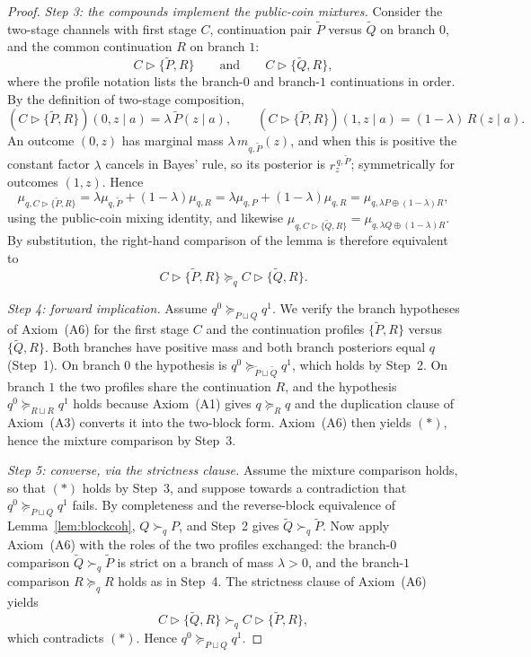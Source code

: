 \documentclass[11pt,a4paper]{article}
\theoremstyle{definition}
\newcommand{\1}{\mathbf 1}
\begin{document}
\begin{proof}
\emph{Step 3: the compounds implement the public-coin mixtures.}
Consider the two-stage channels with first stage $C$, continuation pair $\widetilde P$ versus $\widetilde Q$ on branch
$0$, and the common continuation $R$ on branch $1$:
\[
C\triangleright\{\widetilde P,R\}
\qquad\text{and}\qquad
C\triangleright\{\widetilde Q,R\},
\]
where the profile notation lists the branch-$0$ and branch-$1$ continuations in order.  By the definition of two-stage
composition,
\[
(C\triangleright\{\widetilde P,R\})(0,z\mid a)=\lambda\,\widetilde P(z\mid a),
\qquad
(C\triangleright\{\widetilde P,R\})(1,z\mid a)=(1-\lambda)\,R(z\mid a).
\]
An outcome $(0,z)$ has marginal mass $\lambda\,m_{q,\widetilde P}(z)$, and when this is positive the constant factor
$\lambda$ cancels in Bayes' rule, so its posterior is $r_z^{\,q,\widetilde P}$; symmetrically for outcomes $(1,z)$.
Hence
\[
\mu_{q,C\triangleright\{\widetilde P,R\}}
=
\lambda\mu_{q,\widetilde P}+(1-\lambda)\mu_{q,R}
=
\lambda\mu_{q,P}+(1-\lambda)\mu_{q,R}
=
\mu_{q,\lambda P\oplus(1-\lambda)R},
\]
using the public-coin mixing identity, and likewise
$\mu_{q,C\triangleright\{\widetilde Q,R\}}=\mu_{q,\lambda Q\oplus(1-\lambda)R}$.  By substitution, the right-hand
comparison of the lemma is therefore equivalent to
\[
C\triangleright\{\widetilde P,R\}
\succeq_q
C\triangleright\{\widetilde Q,R\}.
\tag{$\ast$}
\]

\emph{Step 4: forward implication.}
Assume $q^0\succeq_{P\sqcup Q}q^1$.  We verify the branch hypotheses of Axiom~\textup{(A6)} for the first stage $C$ and
the continuation profiles $\{\widetilde P,R\}$ versus $\{\widetilde Q,R\}$.  Both branches have positive mass and both
branch posteriors equal $q$ (Step~1).  On branch $0$ the hypothesis is
$q^0\succeq_{\widetilde P\sqcup\widetilde Q}q^1$, which holds by Step~2.  On branch $1$ the two profiles share the
continuation $R$, and the hypothesis $q^0\succeq_{R\sqcup R}q^1$ holds because Axiom~\textup{(A1)} gives
$q\succeq_R q$ and the duplication clause of Axiom~\textup{(A3)} converts it into the two-block form.
Axiom~\textup{(A6)} then yields $(\ast)$, hence the mixture comparison by Step~3.

\emph{Step 5: converse, via the strictness clause.}
Assume the mixture comparison holds, so that $(\ast)$ holds by Step~3, and suppose towards a contradiction that
$q^0\succeq_{P\sqcup Q}q^1$ fails.  By completeness and the reverse-block equivalence of Lemma~\ref{lem:blockcoh},
$Q\succ_q P$, and Step~2 gives $\widetilde Q\succ_q\widetilde P$.  Now apply Axiom~\textup{(A6)} with the roles of the
two profiles exchanged: the branch-$0$ comparison $\widetilde Q\succ_q\widetilde P$ is strict on a branch of mass
$\lambda>0$, and the branch-$1$ comparison $R\succeq_q R$ holds as in Step~4.  The strictness clause of
Axiom~\textup{(A6)} yields
\[
C\triangleright\{\widetilde Q,R\}
\succ_q
C\triangleright\{\widetilde P,R\},
\]
which contradicts $(\ast)$.  Hence $q^0\succeq_{P\sqcup Q}q^1$.
\end{proof}
\end{document}
